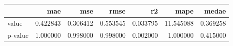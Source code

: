 \begin{tabular}{lrrrrrr}
\toprule
 & mae & mse & rmse & r2 & mape & medae \\
\midrule
value & 0.422843 & 0.306412 & 0.553545 & 0.033795 & 11.545088 & 0.369258 \\
p-value & 1.000000 & 0.998000 & 0.998000 & 0.002000 & 1.000000 & 0.415000 \\
\bottomrule
\end{tabular}
